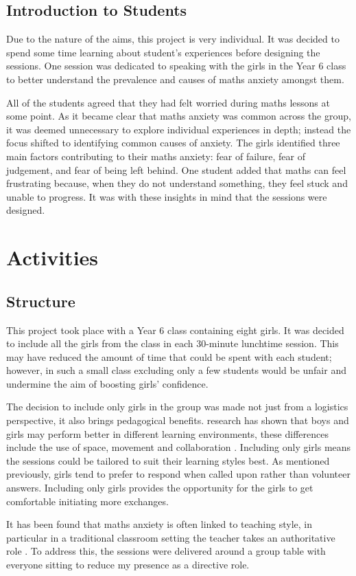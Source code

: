 \documentclass[11pt, a4paper, notitlepage]{article}
\begin{document}
\subsection{Introduction to Students}
Due to the nature of the aims, this project is very individual. It was decided to spend some time learning about student's experiences before designing the sessions. One session was dedicated to speaking with the girls in the Year 6 class to better understand the prevalence and causes of maths anxiety amongst them.
\par
 All of the students agreed that they had felt worried during maths lessons at some point. As it became clear that maths anxiety was common across the group, it was deemed unnecessary to explore individual experiences in depth; instead the focus shifted to identifying common causes of anxiety. The girls identified three main factors contributing to their maths anxiety: fear of failure, fear of judgement, and fear of being left behind. One student added that maths can feel frustrating because, when they do not understand something, they feel stuck and unable to progress. It was with these insights in mind that the sessions were designed.

\section{Activities}

\subsection{Structure}
This project took place with a Year 6 class containing eight girls. It was decided to include all the girls from the class in each 30-minute lunchtime session. This may have reduced the amount of time that could be spent with each student; however, in such a small class excluding only a few students would be unfair and undermine the aim of boosting girls' confidence.
\par
The decision to include only girls in the group was made not just from a logistics perspective, it also brings pedagogical benefits. research has shown that boys and girls may perform better in different learning environments, these differences include the use of space, movement and collaboration \cite{Hughes:2006}. Including only girls means the sessions could be tailored to suit their learning styles best. As mentioned previously, girls tend to prefer to respond when called upon rather than volunteer answers. Including only girls provides the opportunity for the girls to get comfortable initiating more exchanges.
\par 
It has been found that maths anxiety is often linked to teaching style, in particular in a traditional classroom setting the teacher takes an authoritative role \cite{Finlayson:2014}. To address this, the sessions were delivered around a group table with everyone sitting to reduce my presence as a directive role. 
\end{document}
